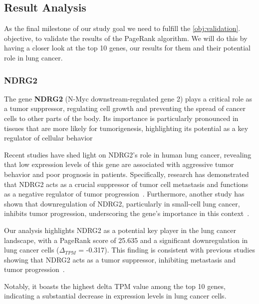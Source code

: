 \subsection{Result Analysis} \label{subsec:result_analysis}
As the final milestone of our study goal we need to fulfill the \ref{obj:validation}.
objective, to validate the results of the PageRank algorithm.
We will do this by having a closer look at the top 10 genes, our results for them and their potential role in lung cancer.
\\

\subsubsection*{NDRG2} \label{subsubsec:ndrg2}
The gene \textbf{NDRG2} (N-Myc downstream-regulated gene 2) plays a critical role as a tumor suppressor,
regulating cell growth and preventing the spread of cancer cells to other parts of the body.
Its importance is particularly pronounced in tissues that are more likely for tumorigenesis,
highlighting its potential as a key regulator of cellular behavior~\cite{Lee2022NDRG2}

Recent studies have shed light on NDRG2's role in human lung cancer,
revealing that low expression levels of this gene are associated with aggressive tumor behavior and poor prognosis in patients.
Specifically, research has demonstrated that NDRG2 acts as a crucial suppressor of tumor cell metastasis and
functions as a negative regulator of tumor progression~\cite{Li2013NDRG2}.
Furthermore, another study has shown that downregulation of NDRG2, particularly in small-cell lung cancer,
inhibits tumor progression, underscoring the gene's importance in this context~\cite{Ma2024NDRG2}.

Our analysis highlights NDRG2 as a potential key player in the lung cancer landscape,
with a PageRank score of 25.635 and a significant downregulation in lung cancer cells ($\Delta_{TPM}$ = -0.317).
This finding is consistent with previous studies showing that NDRG2 acts as a tumor suppressor,
inhibiting metastasis and tumor progression~\cite{Li2013NDRG2,Ma2024NDRG2}.

Notably, it boasts the highest delta TPM value among the top 10 genes,
indicating a substantial decrease in expression levels in lung cancer cells.
\newline

